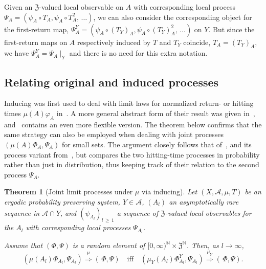 \documentclass[10pt]{amsart}
\newtheorem{theo}{Theorem}[section]
\theoremstyle{definition}\newtheorem{defi}[theo]{Definition}\newtheorem{rema}[theo]{Remark}\newtheorem{exam}[theo]{Example}\newtheorem{exem}[theo]{Example}\newtheorem{nota}[theo]{Notation}
\newcommand{\clA}{\mathcal{A}}
\newcommand{\frkZ}{\mathfrak{Z}}
\newcommand{\bbN}{\mathbb{N}}
\begin{document}
Given an $\frkZ$-valued local observable on $A$ with corresponding local process $\Psi_{A}=(\psi_{A}\circ T_{A},\psi_{A}\circ T_{A}^{2},\,\ldots)$, we can also consider the corresponding object for the first-return map, $\Psi_{A}^{Y}=(\psi_{A}\circ(T_{Y})_{A},\psi_{A}\circ(T_{Y})_{A}^{2},\,\ldots)$ on $Y$. But since the first-return maps on $A$ respectively induced by $T$ and $T_{Y}$ coincide, $T_{A}=(T_{Y})_{A}$, we have $\Psi_{A}^{Y}=\Psi_{A}\mid_{Y}$ and there is no need for this extra notation.

\subsection{Relating original and induced processes}
Inducing was first used to deal with limit laws for normalized return- or hitting times $\mu (A)\varphi_{A}$ in~\cite{BruSauTrouVai}. A more general abstract form of their result was given in~\cite{HWZ}, and~\cite{Zexceptional} contains an even more flexible version. The theorem below confirms that the same strategy can also be employed when dealing with joint processes $(\mu(A)\Phi_{A},\Psi_{A})$ for small sets. The argument closely follows that of~\cite{HWZ}, and its process variant from~\cite{FFTV}, but compares the two hitting-time processes in probability rather than just in distribution, thus keeping track of their relation to the second process $\Psi_{A}$.

\begin{theo}[{Joint limit processes under $\mu$ via inducing}]\label{T_InduceSpatioTempMu}
Let $(X,\clA,\mu,T)$ be an ergodic probability preserving system, $Y\in\clA$, $(A_{l})$ an asymptotically rare sequence in $\clA\cap Y$, and $(\psi_{A_{l}})_{l\,\geq\,1}$ a sequence of $\frkZ$-valued local observables for the $A_{l}$ with corresponding local processes $\Psi_{A_{l}}$.

Assume that $(\Phi,\Psi)$ is a random element of $[0,\infty)^{\bbN }\times\frkZ^{\bbN}$. Then, as $l\rightarrow\infty$,
\begin{equation}\label{Eq_cvcvcvcvcvbbbbbbbb}
\left(\mu(A_{l})\Phi_{A_{l}},\Psi_{A_{l}}\right)\overset{\mu}{\Longrightarrow} (\,\Phi,\Psi)\quad\text{iff}\quad(\mu_{Y}(A_{l})\Phi_{A_{l}}^{Y},\Psi_{A_{l} })\overset{\mu_{Y}}{\Longrightarrow}(\,\Phi,\Psi).
\end{equation}
\end{theo}
\end{document}
